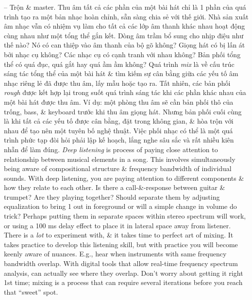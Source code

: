 \documentclass{article}
\begin{document}
\begin{itemize}
\begin{itemize}
		-- {\sf Trộn \& master.} Thu âm tất cả các phần của một bài hát chỉ là 1 phần của quá trình tạo ra một bản nhạc hoàn chỉnh, sẵn sàng chia sẻ với thế giới. Nhà sản xuất âm nhạc vẫn có nhiệm vụ làm cho tất cả các lớp âm thanh khác nhau hoạt động cùng nhau như một tổng thể gắn kết. Dòng âm trầm bổ sung cho nhịp điệu như thế nào? Nó có can thiệp vào âm thanh của bộ gõ không? Giọng hát có bị lấn át bởi nhạc cụ không? Các nhạc cụ có cạnh tranh với nhau không? Bản phối tổng thể có quá đục, quá gắt hay quá ầm ầm không? Quá trình {\it mix} là về cấu trúc sáng tác tổng thể của một bài hát \& tìm kiếm sự cân bằng giữa các yếu tố âm nhạc riêng lẻ đã được thu âm, lấy mẫu hoặc tạo ra. Tất nhiên, các bản phối {\it rough} được kết hợp lại trong suốt quá trình sáng tác khi các phần khác nhau của một bài hát được thu âm. Ví dụ: một phòng thu âm sẽ cần bản phối thô của trống, bass, \& keyboard trước khi thu âm giọng hát. Nhưng bản phối cuối cùng là khi tất cả các yếu tố được cân bằng, đặt trong không gian, \& hòa trộn với nhau để tạo nên một tuyên bố nghệ thuật. Việc phối nhạc có thể là một quá trình phức tạp đòi hỏi phải lập kế hoạch, lắng nghe sâu sắc và rất nhiều kiên nhẫn để làm đúng.		
		{\it Deep listening} is process of paying close attention to relationship between musical elements in a song. This involves simultaneously being aware of compositional structure \& frequency bandwidth of individual sounds. With deep listening, you are paying attention to different components \& how they relate to each other. Is there a call-\&-response between guitar \& trumpet? Are they playing together? Should separate them by adjusting  equalization to bring 1 out in foreground or will a simple change in volume do trick? Perhaps putting them in separate spaces within stereo spectrum will work, or using a 100 ms delay effect to place it in lateral space away from listener. There is a {\it lot} to experiment with, \& it takes time to perfect art of mixing. It takes practice to develop this listening skill, but with practice you will become keenly aware of nuances. E.g., hear when instruments with same frequency bandwidth overlap. With digital tools that allow real-time frequency spectrum analysis, can actually see where they overlap. Don't worry about getting it right 1st time; mixing is a process that can require several iterations before you reach that ``sweet'' spot.


\end{itemize}
\end{itemize}
\end{document}
